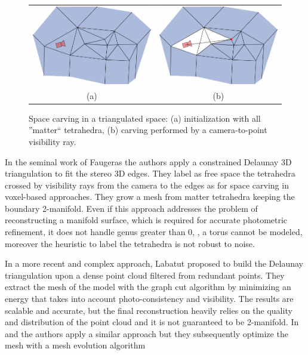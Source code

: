 \begin{figure}[t]
\centering
 \begin{tabular}{cc}
  \includegraphics[width=0.44\columnwidth]{./img/ch_soa/spaceCarving01}&
  \includegraphics[width=0.44\columnwidth]{./img/ch_soa/spaceCarving02}\\
  (a) & (b)\\
 \end{tabular}
 \caption{Space carving in a triangulated space: (a) initialization with all ''matter`` tetrahedra, (b) carving performed by a camera-to-point visibility ray.}
 \label{fig:spacecarving}
\end{figure}


In the seminal work of Faugeras \etal \cite{faugeras_et_al_90} the authors apply a constrained Delaunay 3D triangulation to fit the stereo 3D edges. They label  as free space the tetrahedra crossed by visibility rays from the camera to the edges as for space carving in voxel-based approaches. They grow a mesh from matter tetrahedra  keeping the boundary 2-manifold. 
Even if this approach addresses the problem of reconstructing a manifold surface, which is required for accurate photometric refinement, it does not handle genus greater than 0, \eg, a torus cannot be modeled, moreover the heuristic to label the tetrahedra is not robust to noise.


In a more recent and complex approach, Labatut \etal \cite{labatut2007efficient} proposed to build the Delaunay triangulation upon a dense point cloud filtered from redundant points. 
They extract the mesh of the model with the graph cut algorithm by minimizing an energy that takes into account photo-consistency and visibility. The results are scalable and accurate, but the final reconstruction heavily relies on the quality and distribution of the point cloud and it is not guaranteed to be 2-manifold.
In \cite{hiep2009towards} and \cite{vu_et_al_2012} the authors apply a similar approach but they subsequently optimize the mesh with a mesh evolution algorithm

